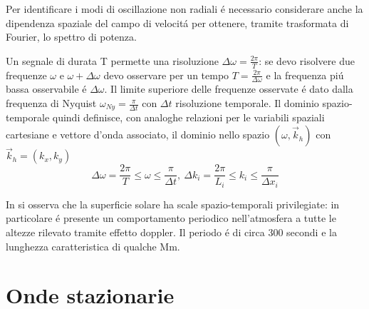 \documentclass[../main.tex]{subfiles}
\begin{document}


Per identificare i modi di oscillazione non radiali \'e necessario considerare anche la dipendenza spaziale del campo di velocit\'a per ottenere, tramite trasformata di Fourier, lo spettro di potenza.

Un segnale di durata T permette una risoluzione $\Delta\omega=\frac{2\pi}{T}$: se devo risolvere due frequenze $\omega$ e $\omega+\Delta\omega$ devo osservare per un tempo $T=\frac{2\pi}{\Delta\omega}$ e la frequenza pi\'u bassa osservabile \'e $\Delta\omega$. Il limite superiore delle frequenze osservate \'e dato dalla frequenza di Nyquist $\omega_{Ny}=\frac{\pi}{\Delta t}$ con $\Delta t$ risoluzione temporale. Il dominio spazio-temporale quindi definisce, con analoghe relazioni per le variabili spaziali cartesiane e vettore d'onda associato, il dominio nello spazio $(\omega,\vec{k}_h)$ con $\vec{k}_h=(k_x,k_y)$
\begin{equation}
\Delta\omega=\frac{2\pi}{T}\leq\omega\leq\frac{\pi}{\Delta t},\ \Delta k_i=\frac{2\pi}{L_i}\leq k_i\leq\frac{\pi}{\Delta x_i}
\end{equation}

In \citet{lei62velocity} si osserva che la superficie solare ha scale spazio-temporali privilegiate: in particolare \'e presente un comportamento periodico nell'atmosfera a tutte le altezze rilevato tramite effetto doppler. Il periodo \'e di circa 300 secondi e la lunghezza caratteristica di qualche \si{\mega\meter}.



\section{Onde stazionarie}
\end{document}
